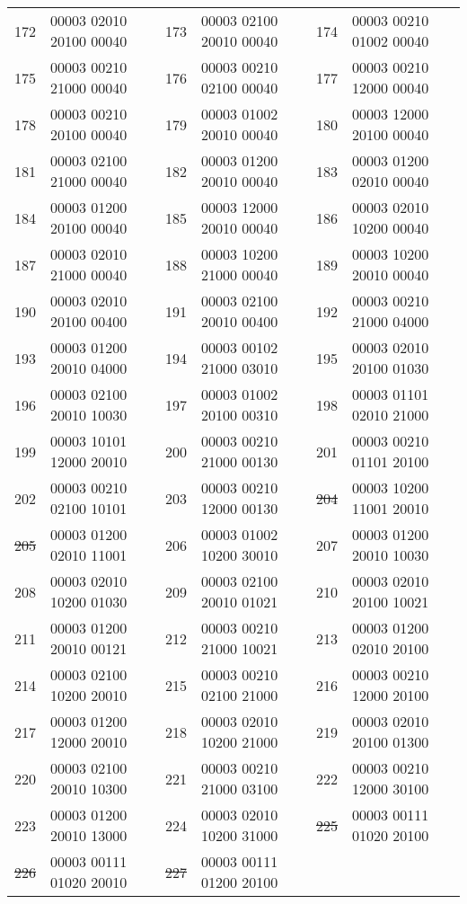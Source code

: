 \begin{tabular}{|l|l||l|l||l|l|}
{172} &00003 02010 20100 00040 &
{173} &00003 02100 20010 00040 &
{174} &00003 00210 01002 00040 \\
{175} &00003 00210 21000 00040 &
{176} &00003 00210 02100 00040 &
{177} &00003 00210 12000 00040 \\
{178} &00003 00210 20100 00040 &
{179} &00003 01002 20010 00040 &
{180} &00003 12000 20100 00040 \\
{181} &00003 02100 21000 00040 &
{182} &00003 01200 20010 00040 &
{183} &00003 01200 02010 00040 \\
{184} &00003 01200 20100 00040 &
{185} &00003 12000 20010 00040 &
{186} &00003 02010 10200 00040 \\
{187} &00003 02010 21000 00040 &
{188} &00003 10200 21000 00040 &
{189} &00003 10200 20010 00040 \\
{190} &00003 02010 20100 00400 &
{191} &00003 02100 20010 00400 &
{192} &00003 00210 21000 04000 \\
{193} &00003 01200 20010 04000 &
{194} &00003 00102 21000 03010 &
{195} &00003 02010 20100 01030 \\
{196} &00003 02100 20010 10030 &
{197} &00003 01002 20100 00310 &
{198} &00003 01101 02010 21000 \\
{199} &00003 10101 12000 20010 &
{200} &00003 00210 21000 00130 &
{201} &00003 00210 01101 20100 \\
{202} &00003 00210 02100 10101 &
{203} &00003 00210 12000 00130 &
\sout{204} &00003 10200 11001 20010 \\
\sout{205} &00003 01200 02010 11001 &
{206} &00003 01002 10200 30010 &
{207} &00003 01200 20010 10030 \\
{208} &00003 02010 10200 01030 &
{209} &00003 02100 20010 01021 &
{210} &00003 02010 20100 10021 \\
{211} &00003 01200 20010 00121 &
{212} &00003 00210 21000 10021 &
{213} &00003 01200 02010 20100 \\
{214} &00003 02100 10200 20010 &
{215} &00003 00210 02100 21000 &
{216} &00003 00210 12000 20100 \\
{217} &00003 01200 12000 20010 &
{218} &00003 02010 10200 21000 &
{219} &00003 02010 20100 01300 \\
{220} &00003 02100 20010 10300 &
{221} &00003 00210 21000 03100 &
{222} &00003 00210 12000 30100 \\
{223} &00003 01200 20010 13000 &
{224} &00003 02010 10200 31000 &
\sout{225} &00003 00111 01020 20100 \\
\sout{226} &00003 00111 01020 20010 &
\sout{227} &00003 00111 01200 20100 &

\end{tabular}
